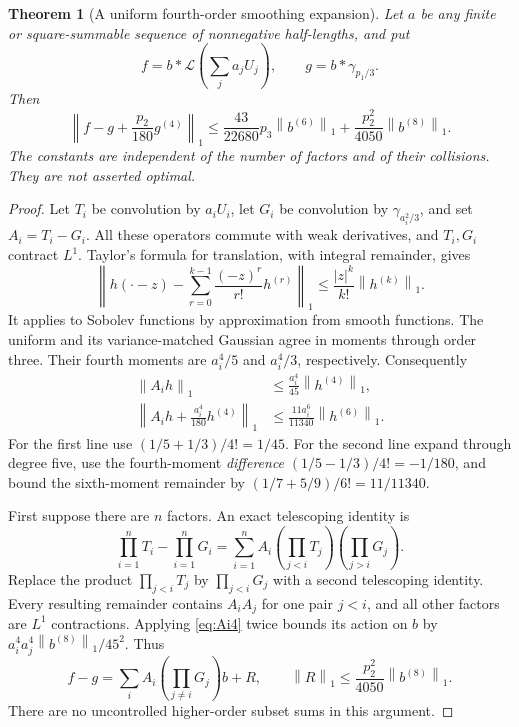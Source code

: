 \documentclass[11pt,letterpaper]{article}
\numberwithin{equation}{section}
\newtheorem{theorem}{Theorem}[section]
\theoremstyle{definition}
\theoremstyle{remark}
\newcommand{\Law}{\mathcal L}
\newcommand{\norm}[1]{\left\lVert#1\right\rVert}
\begin{document}
\begin{theorem}[A uniform fourth-order smoothing expansion]
\label{thm:dust}
Let $a$ be any finite or square-summable sequence of nonnegative half-lengths,
and put
\[
 f=b*\Law\left(\sum_j a_jU_j\right),\qquad
 g=b*\gamma_{p_1/3}.
\]
Then
\begin{equation}
 \left\|f-g+\frac{p_2}{180}g^{(4)}\right\|_1
 \le \frac{43}{22680}p_3\norm{b^{(6)}}_1
      +\frac{p_2^2}{4050}\norm{b^{(8)}}_1.
 \label{eq:dustbound}
\end{equation}
The constants are independent of the number of factors and of their collisions.
They are not asserted optimal.
\end{theorem}
\begin{proof}
Let $T_i$ be convolution by $a_iU_i$, let $G_i$ be convolution by
$\gamma_{a_i^2/3}$, and set $A_i=T_i-G_i$. All these operators commute with
weak derivatives, and $T_i,G_i$ contract $L^1$. Taylor's formula for
translation, with integral remainder, gives
\begin{equation}
 \left\|h(\cdot-z)-\sum_{r=0}^{k-1}
          \frac{(-z)^r}{r!}h^{(r)}\right\|_1
 \le\frac{|z|^k}{k!}\norm{h^{(k)}}_1.
 \label{eq:translationbound}
\end{equation}
It applies to Sobolev functions by approximation from smooth functions.
The uniform and its variance-matched Gaussian agree in moments through order
three. Their fourth moments are $a_i^4/5$ and $a_i^4/3$, respectively.
Consequently
\begin{align}
 \norm{A_i h}_1&\le\frac{a_i^4}{45}\norm{h^{(4)}}_1,
 \label{eq:Ai4}\\
 \left\|A_i h+\frac{a_i^4}{180}h^{(4)}\right\|_1
 &\le\frac{11a_i^6}{11340}\norm{h^{(6)}}_1.
 \label{eq:Ai6}
\end{align}
For the first line use $(1/5+1/3)/4!=1/45$.
For the second line expand through degree five, use the fourth-moment
\emph{difference} $(1/5-1/3)/4!=-1/180$, and bound the sixth-moment
remainder by $(1/7+5/9)/6!=11/11340$.

First suppose there are $n$ factors. An exact telescoping identity is
\[
 \prod_{i=1}^n T_i-\prod_{i=1}^n G_i
 =\sum_{i=1}^n A_i
       \left(\prod_{j<i}T_j\right)\left(\prod_{j>i}G_j\right).
\]
Replace the product $\prod_{j<i}T_j$ by $\prod_{j<i}G_j$ with a second
telescoping identity. Every resulting remainder contains $A_iA_j$ for
one pair $j<i$, and all other factors are $L^1$ contractions. Applying
\eqref{eq:Ai4} twice bounds its action on $b$ by
$a_i^4a_j^4\norm{b^{(8)}}_1/45^2$. Thus
\begin{equation}
 f-g=\sum_i A_i\left(\prod_{j\ne i}G_j\right)b+R,
 \qquad
 \norm R_1\le\frac{p_2^2}{4050}\norm{b^{(8)}}_1.
 \label{eq:doubletelescoping}
\end{equation}
There are no uncontrolled higher-order subset sums in this argument.


\end{proof}
\end{document}
